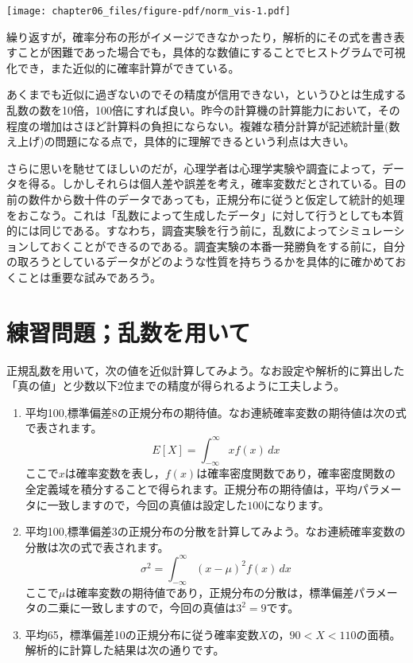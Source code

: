 \documentclass[
  a4paper,
]{ltjsbook}
\providecommand{\tightlist}{%
  \setlength{\itemsep}{0pt}\setlength{\parskip}{0pt}}\usepackage{longtable,booktabs,array}
\begin{document}
\texttt{[image: chapter06\_files/figure-pdf/norm\_vis-1.pdf]}

繰り返すが，確率分布の形がイメージできなかったり，解析的にその式を書き表すことが困難であった場合でも，具体的な数値にすることでヒストグラムで可視化でき，また近似的に確率計算ができている。

あくまでも近似に過ぎないのでその精度が信用できない，というひとは生成する乱数の数を10倍，100倍にすれば良い。昨今の計算機の計算能力において，その程度の増加はさほど計算料の負担にならない。複雑な積分計算が記述統計量(数え上げ)の問題になる点で，具体的に理解できるという利点は大きい。

さらに思いを馳せてほしいのだが，心理学者は心理学実験や調査によって，データを得る。しかしそれらは個人差や誤差を考え，確率変数だとされている。目の前の数件から数十件のデータであっても，正規分布に従うと仮定して統計的処理をおこなう。これは「乱数によって生成したデータ」に対して行うとしても本質的には同じである。すなわち，調査実験を行う前に，乱数によってシミュレーションしておくことができるのである。調査実験の本番一発勝負をする前に，自分の取ろうとしているデータがどのような性質を持ちうるかを具体的に確かめておくことは重要な試みであろう。

\section{練習問題；乱数を用いて}\label{ux7df4ux7fd2ux554fux984cux4e71ux6570ux3092ux7528ux3044ux3066}

正規乱数を用いて，次の値を近似計算してみよう。なお設定や解析的に算出した「真の値」と少数以下2位までの精度が得られるように工夫しよう。

\begin{enumerate}
\def\labelenumi{\arabic{enumi}.}
\tightlist
\item
  平均100,標準偏差8の正規分布の期待値。なお連続確率変数の期待値は次の式で表されます。\[E[X] = \int_{-\infty}^{\infty} x f(x) \, dx\]
  ここで\(x\)は確率変数を表し，\(f(x)\)は確率密度関数であり，確率密度関数の全定義域を積分することで得られます。正規分布の期待値は，平均パラメータに一致しますので，今回の真値は設定した\(100\)になります。
\item
  平均100,標準偏差3の正規分布の分散を計算してみよう。なお連続確率変数の分散は次の式で表されます。\[\sigma^2 = \int_{-\infty}^{\infty} (x - \mu)^2 f(x) \, dx\]
  ここで\(\mu\)は確率変数の期待値であり，正規分布の分散は，標準偏差パラメータの二乗に一致しますので，今回の真値は\(3^2 = 9\)です。
\item
  平均65，標準偏差10の正規分布に従う確率変数\(X\)の，\(90 < X < 110\)の面積。解析的に計算した結果は次の通りです。
\end{enumerate}
\end{document}
